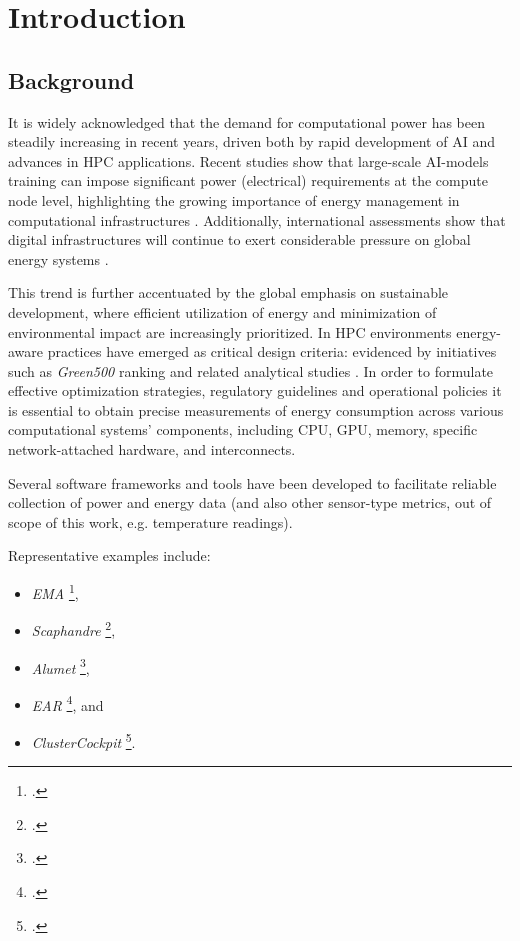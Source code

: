 \section{Introduction}

\subsection{Background}

It is widely acknowledged that the demand for computational power has
been steadily increasing in recent years, driven both by rapid development of
\gls{AI} and advances in \gls{HPC} applications. Recent studies show that
large-scale AI-models training can impose significant power (electrical)
requirements at the compute node level, highlighting the growing importance
of energy management in computational infrastructures \parencite{Latif_2025}.
Additionally, international assessments show that digital infrastructures
will continue to exert considerable pressure on global energy systems
\parencite{IEA2025_AI_Energy}.

This trend is further accentuated by the global emphasis on sustainable
development, where efficient utilization of energy and minimization of
environmental impact are increasingly prioritized. In \gls{HPC} environments
energy-aware practices have emerged as critical design criteria: evidenced by
initiatives such as \emph{Green500} ranking and related analytical studies
\parencite{GreenHPC}. In order to formulate effective optimization strategies,
regulatory guidelines and operational policies it is essential to obtain precise
measurements of energy consumption across various computational systems'
components, including \gls{CPU}, \gls{GPU}, memory, specific network-attached
hardware, and interconnects.

Several software frameworks and tools have been developed to facilitate
reliable collection of power and energy data (and also other sensor-type
metrics, out of scope of this work, e.g. temperature readings).

Representative examples include:
\begin{itemize}
  \item \emph{EMA} \footcite{EMA_git},
  \item \emph{Scaphandre} \footcite{Scaphandre},
  \item \emph{Alumet} \footcite{Alumet},
  \item \emph{EAR} \footcite{EAR}, and
  \item \emph{ClusterCockpit} \footcite{ClusterCockpit}.
\end{itemize}

